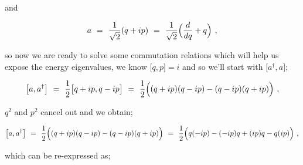 \documentclass{article}
\begin{document}
and

\begin{equation} \label{eb-eq-256-13}
a \hspace{0.125cm} = \hspace{0.125cm} \frac{1}{\sqrt{2}} ( q + i p)  \hspace{0.125cm} = \hspace{0.125cm} \frac{1}{\sqrt{2}} \Big( \frac{d}{dq} + q \Big)  \hspace{0.125cm} ,
\end{equation}

so now we are ready to solve some commutation relations which will help us expose the energy eigenvalues, we know \begin{math} \big[ q , p \big] = i \end{math} and so we'll start with \begin{math} \big[ a^{\dagger} , a \big]  \end{math};

\begin{equation} \label{eb-eq-256-14}
\big[ a , a^{\dagger} \big] \hspace{0.125cm} = \hspace{0.125cm} \frac{1}{2} \big[ q + ip , q - ip \big] \hspace{0.125cm} = \hspace{0.125cm} \frac{1}{2} \Big( ( q + ip )( q - ip ) - ( q - ip )( q + ip ) \Big) \hspace{0.125cm} ,
\end{equation}

\begin{math} q^2 \end{math} and \begin{math} p^2 \end{math} cancel out and we obtain;

\begin{equation} \label{eb-eq-256-15}
\big[ a , a^{\dagger} \big] \hspace{0.125cm} = \hspace{0.125cm} \frac{1}{2} \Big( ( q + ip )( q - ip ) - ( q - ip )( q + ip ) \Big) \hspace{0.125cm} = \hspace{0.125cm} \frac{1}{2} \Big( q ( -i p ) - ( - i p ) q + ( i p ) q - q ( i p ) \Big) \hspace{0.125cm} ,
\end{equation}

which can be re-expressed as;
\end{document}
